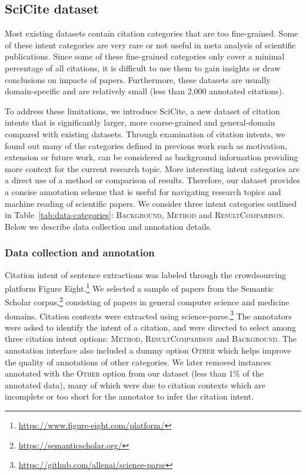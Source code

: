 \documentclass[11pt,a4paper]{article}
\newcommand{\ourdata}{SciCite\xspace}
\newcommand{\background}{\textsc{Background}\xspace}
\newcommand{\method}{\textsc{Method}\xspace}
\newcommand{\result}{\textsc{ResultComparison}\xspace}
\begin{document}
\subsection{\ourdata dataset}
Most existing datasets contain citation categories that are too fine-grained. Some of these intent categories are very rare or not useful in meta analysis of scientific publications. Since some of these fine-grained categories only cover a minimal percentage of all citations, it is difficult to use them to gain insights or draw conclusions on impacts of papers. Furthermore, these datasets are usually domain-specific and are relatively small (less than 2,000 annotated citations).

To address these limitations, we introduce \ourdata, a new dataset of citation intents that is significantly larger, more coarse-grained and general-domain compared with existing datasets. Through examination of citation intents, we found out many of the categories defined in previous work such as motivation, extension or future work, can be considered as background information providing more context for the current research topic. More interesting intent categories are a direct use of a method or comparison of results. Therefore, our dataset provides a concise annotation scheme that is useful for navigating research topics and machine reading of scientific papers. We consider three intent categories outlined in Table~\ref{tab:data-categories}: \background, \method and \result. Below we describe data collection and annotation details.

\subsubsection{Data collection and annotation}
Citation intent of sentence extractions was labeled through the crowdsourcing platform Figure Eight.\footnote{\url{https://www.figure-eight.com/platform/}} We selected a sample of papers from the Semantic Scholar corpus,\footnote{\url{https://semanticscholar.org/}} consisting of papers in general computer science and medicine domains. Citation contexts were extracted using science-parse.\footnote{\url{https://github.com/allenai/science-parse}} The annotators were asked to identify the intent of a citation, and were directed to select among three citation intent options: \method, \result and \background. The annotation interface also included a dummy option \textsc{Other} which helps improve the quality of annotations of other categories. We later removed instances annotated with the \textsc{Other} option from our dataset (less than 1\% of the annotated data), many of which were due to citation contexts which are incomplete or too short for the annotator to infer the citation intent.
\end{document}
